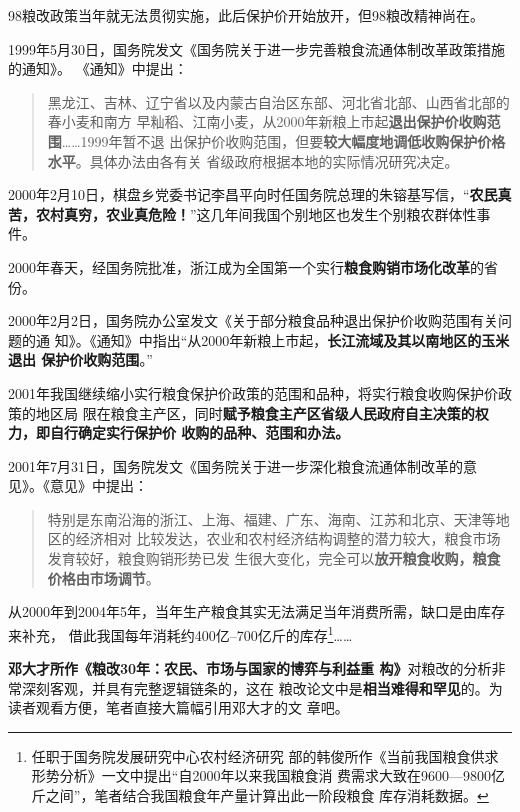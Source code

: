 98粮改政策当年就无法贯彻实施，此后保护价开始放开，但98粮改精神尚在。

1999年5月30日，国务院发文《国务院关于进一步完善粮食流通体制改革政策措施的通知》。
《通知》中提出：
\begin{quotation}
  黑龙江、吉林、辽宁省以及内蒙古自治区东部、河北省北部、山西省北部的春小麦和南方
  早籼稻、江南小麦，从2000年新粮上市起\textbf{退出保护价收购范围}……1999年暂不退
  出保护价收购范围，但要\textbf{较大幅度地调低收购保护价格水平}。具体办法由各有关
  省级政府根据本地的实际情况研究决定。
\end{quotation}

2000年2月10日，棋盘乡党委书记李昌平向时任国务院总理的朱镕基写信，“\textbf{农民真
  苦，农村真穷，农业真危险！}”这几年间我国个别地区也发生个别粮农群体性事件。

2000年春天，经国务院批准，浙江成为全国第一个实行\textbf{粮食购销市场化改革}的省
份。

2000年2月2日，国务院办公室发文《关于部分粮食品种退出保护价收购范围有关问题的通
知》。《通知》中指出“从2000年新粮上市起，\textbf{长江流域及其以南地区的玉米退出
  保护价收购范围}。”

2001年我国继续缩小实行粮食保护价政策的范围和品种，将实行粮食收购保护价政策的地区局
限在粮食主产区，同时\textbf{赋予粮食主产区省级人民政府自主决策的权力，即自行确定实行保护价
  收购的品种、范围和办法。}

2001年7月31日，国务院发文《国务院关于进一步深化粮食流通体制改革的意
见》。《意见》中提出：
\begin{quotation}
  特别是东南沿海的浙江、上海、福建、广东、海南、江苏和北京、天津等地区的经济相对
  比较发达，农业和农村经济结构调整的潜力较大，粮食市场发育较好，粮食购销形势已发
  生很大变化，完全可以\textbf{放开粮食收购，粮食价格由市场调节}。
\end{quotation}


从2000年到2004年5年，当年生产粮食其实无法满足当年消费所需，缺口是由库存来补充，
借此我国每年消耗约400亿--700亿斤的库存\footnote{任职于国务院发展研究中心农村经济研究
  部的韩俊所作《当前我国粮食供求形势分析》一文中提出“自2000年以来我国粮食消
  费需求大致在9600—9800亿斤之间”，笔者结合我国粮食年产量计算出此一阶段粮食
  库存消耗数据。}……

\textbf{邓大才所作《粮改30年：农民、市场与国家的博弈与利益重
  构》}\cite{dacailianggai}对粮改的分析非常深刻客观，并具有完整逻辑链条的，这在
粮改论文中是\textbf{相当难得和罕见}的。为读者观看方便，笔者直接大篇幅引用邓大才的文
章吧。

